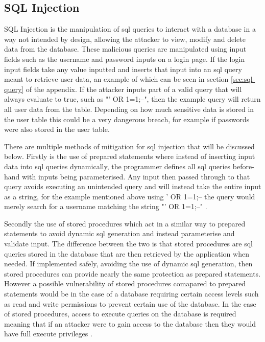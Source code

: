 \documentclass{ueacmpstyle}
\begin{document}
      \subsection{SQL Injection}\label{sub:SqlInjection}
      SQL Injection is the manipulation of sql queries to interact with a database in 
      a way not intended by design, allowing the attacker to view, modify and delete 
      data from the database. These malicious queries are manipulated using input 
      fields such as the username and password inputs on a login page. If the login 
      input fields take any value inputted and inserts that input into an sql query 
      meant to retrieve user data, an example of which can be seen in section 
      \ref{sec:sql-query} of the appendix. If the attacker inputs part of a valid query 
      that will always evaluate to true, such as "' OR 1=1;--", then the example query 
      will return all user data from the table. Depending on how much sensitive data 
      is stored in the user table this could be a very dangerous breach, for example 
      if passwords were also stored in the user table.

      There are multiple methods of mitigation for sql injection that will be discussed 
      below. Firstly is the use of prepared statements where instead of inserting input 
      data into sql queries dynamically, the programmer defines all sql queries before-
      hand with inputs being parameterised. Any input then passed through to that query 
      avoids executing an unintended query and will instead take the entire input as a 
      string, for the example mentioned above using ' OR 1=1;-- the query would merely 
      search for a username matching the string "' OR 1=1;--" \citep{OWASPSqlInjectionPrevention}. 

      Secondly the use of stored procedures which act in a similar way to prepared 
      statements to avoid dynamic sql generation and instead parameterise and validate 
      input. The difference between the two is that stored procedures are sql queries 
      stored in the database that are then retrieved by the application when needed. 
      If implemented safely, avoiding the use of dynamic sql generation, then stored 
      procedures can provide nearly the same protection as prepared statements. 
      However a possible vulnerability of stored procedures comapared to prepared 
      statements would be in the case of a database requiring certain access levels 
      such as read and write permissions to prevent certain use of the database. In 
      the case of stored procedures, access to execute queries on the database is 
      required meaning that if an attacker were to gain access to the database then 
      they would have full execute privileges \citep{OWASPSqlInjectionPrevention}.
\end{document}
